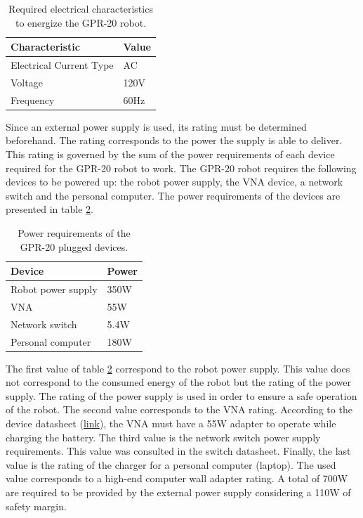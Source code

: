 \documentclass{article}
\begin{document}
\begin{table}[h]
    \centering
    \begin{tabular}{|l|l|}
        \hline \textbf{Characteristic} & \textbf{Value} \\ \hline
        Electrical Current Type & AC \\ \hline
        Voltage & 120V \\ \hline
        Frequency & 60Hz \\ \hline
    \end{tabular}
    \caption{Required electrical characteristics to energize the GPR-20 robot.}
    \label{tab:electrical_characteristics}
\end{table}

Since an external power supply is used, its rating must be determined beforehand. The rating corresponds to the power the supply is able to deliver. This rating is governed by the sum of the power requirements of each device required for the GPR-20 robot to work. The GPR-20 robot requires the following devices to be powered up: the robot power supply, the VNA device, a network switch and the personal computer. The power requirements of the devices are presented in table \ref{tab:power_requirements}.

\begin{table}[h]
    \centering
    \begin{tabular}{|l|l|}
        \hline \textbf{Device} & \textbf{Power} \\ \hline
        Robot power supply & 350W \\ \hline
        VNA & 55W \\ \hline
        Network switch & 5.4W \\ \hline
        Personal computer & 180W \\ \hline
    \end{tabular}
    \caption{Power requirements of the GPR-20 plugged devices.}
    \label{tab:power_requirements}
\end{table}

The first value of table \ref{tab:power_requirements} correspond to the robot power supply. This value does not correspond to the consumed energy of the robot but the rating of the power supply. The rating of the power supply is used in order to ensure a safe operation of the robot. The second value corresponds to the VNA rating. According to the device datasheet (\href{https://dl.cdn-anritsu.com/en-us/test-measurement/files/Brochures-Datasheets-Catalogs/datasheet/11410-00548AM.pdf}{link}), the VNA must have a 55W adapter to operate while charging the battery. The third value is the network switch power supply requirements. This value was consulted in the switch datasheet. Finally, the last value is the rating of the charger for a personal computer (laptop). The used value corresponds to a high-end computer wall adapter rating. A total of 700W are required to be provided by the external power supply considering a 110W of safety margin.
\end{document}
